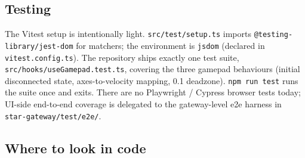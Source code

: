 \subsection{Testing}

The Vitest setup is intentionally light. \texttt{src/test/setup.ts}
imports \texttt{@testing-library/jest-dom} for matchers; the
environment is \texttt{jsdom} (declared in \texttt{vitest.config.ts}).
The repository ships exactly one test suite,
\texttt{src/hooks/useGamepad.test.ts}, covering the three gamepad
behaviours (initial disconnected state, axes-to-velocity mapping,
0.1 deadzone). \texttt{npm run test} runs the suite once and exits.
There are no Playwright / Cypress browser tests today; UI-side
end-to-end coverage is delegated to the gateway-level e2e harness in
\texttt{star-gateway/test/e2e/}.

\subsection{Where to look in code}

